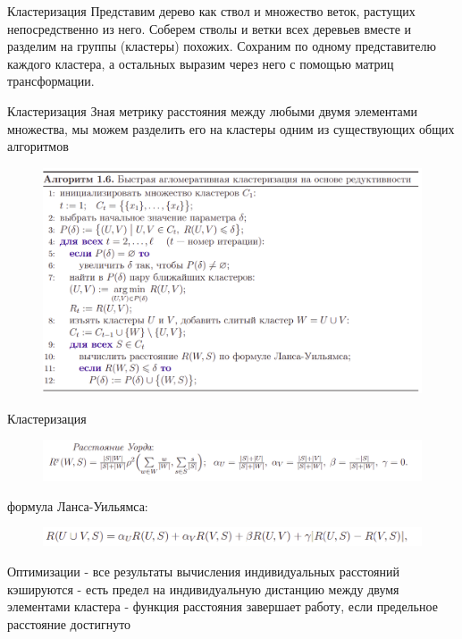 \documentclass[11pt]{beamer}
\begin{document}
\begin{frame}{Кластеризация}
Представим дерево как ствол и множество веток, растущих непосредственно из него. \linebreak
Соберем стволы и ветки всех деревьев вместе и разделим на группы (кластеры) похожих.\linebreak
Сохраним по одному представителю каждого кластера, а остальных выразим через него с помощью матриц трансформации.
\end{frame}
\begin{frame}{Кластеризация}
Зная метрику расстояния между любыми двумя элементами множества, мы можем
разделить его на кластеры одним из существующих общих алгоритмов 
\begin{figure}[hbtp]
\includegraphics[scale=0.225]{c1.png}
\end{figure}
\end{frame}
\begin{frame}{Кластеризация}
\begin{figure}[hbtp]
\includegraphics[scale=0.275]{c2.png}
\end{figure}
формула Ланса-Уильямса:
\begin{figure}[hbtp]
\includegraphics[scale=0.275]{c3.png}
\end{figure}
\end{frame}
\begin{frame}{Оптимизации}
- все результаты вычисления индивидуальных расстояний кэшируются\linebreak 
- есть предел на индивидуальную дистанцию между двумя элементами кластера\linebreak 
- функция расстояния завершает работу, если предельное расстояние достигнуто\linebreak 
\end{frame}
\end{document}
